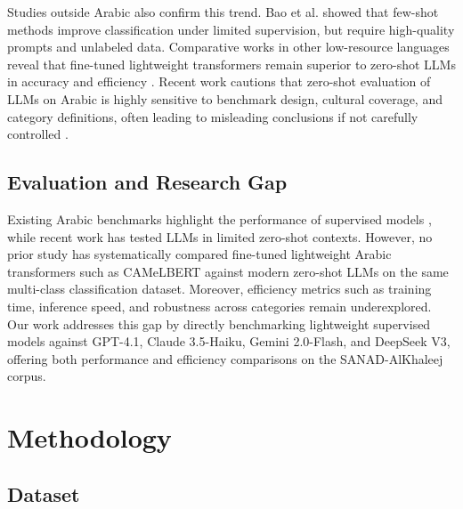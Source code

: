 \documentclass[preprint,12pt,authoryear]{elsarticle}
\begin{document}
Studies outside Arabic also confirm this trend. Bao et al. \cite{bao2019few} showed that few-shot methods improve classification under limited supervision, but require high-quality prompts and unlabeled data. Comparative works in other low-resource languages reveal that fine-tuned lightweight transformers remain superior to zero-shot LLMs in accuracy and efficiency \cite{ali2022deep}.
Recent work cautions that zero-shot evaluation of LLMs on Arabic is highly sensitive to benchmark design, cultural coverage, and category definitions, often leading to misleading conclusions if not carefully controlled \cite{mansour2023sarcasm,al2025need}.


\sloppy
\subsection{Evaluation and Research Gap}
Existing Arabic benchmarks highlight the performance of supervised models \cite{nassif2022arabic, elgendy2024toxicity}, while recent work has tested LLMs in limited zero-shot contexts. However, no prior study has systematically compared fine-tuned lightweight Arabic transformers such as CAMeLBERT against modern zero-shot LLMs on the same multi-class classification dataset. Moreover, efficiency metrics such as training time, inference speed, and robustness across categories remain underexplored. Our work addresses this gap by directly benchmarking lightweight supervised models against GPT-4.1, Claude 3.5-Haiku, Gemini 2.0-Flash, and DeepSeek V3, offering both performance and efficiency comparisons on the SANAD-AlKhaleej corpus.

\section{Methodology}
\label{methodology}
\label{dataset}
\subsection{Dataset}
\end{document}
